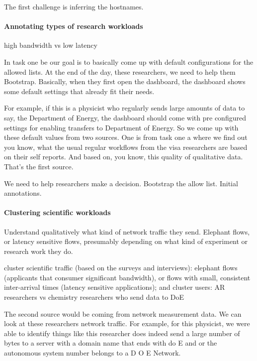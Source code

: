 The first challenge is inferring the hostnames.


\paragraph{Annotating types of research workloads}
high bandwidth vs low latency

In task one be our goal is to basically come up with default configurations for the allowed lists. At the end of the day, these researchers, we need to help them Bootstrap. Basically, when they first open the dashboard, the dashboard shows some default settings that already fit their needs.

For example, if this is a physicist who regularly sends large amounts of data to say, the Department of Energy, the dashboard should come with pre configured settings for enabling transfers to Department of Energy. So we come up with these default values from two sources. One is from task one a where we find out you know, what the usual regular workflows from the visa researchers are based on their self reports. And based on, you know, this quality of qualitative data. That's the first source.

We need to help researchers make a decision. Bootstrap the allow list. Initial annotations.



\paragraph{Clustering scientific workloads}
Understand qualitatively what kind of network traffic they send. Elephant flows, or latency sensitive flows, presumably depending on what kind of experiment or research work they do.


cluster scientific traffic (based on the surveys and interviews): elephant flows (applicants that consumer significant bandwidth), or flows with small, consistent inter-arrival times (latency sensitive applications); and cluster users: AR researchers vs chemistry researchers who send data to DoE




The second source would be coming from network measurement data. We can look at these researchers network traffic. For example, for this physicist, we were able to identify things like this researcher does indeed send a large number of bytes to a server with a domain name that ends with do E and or the autonomous system number belongs to a D O E Network.

